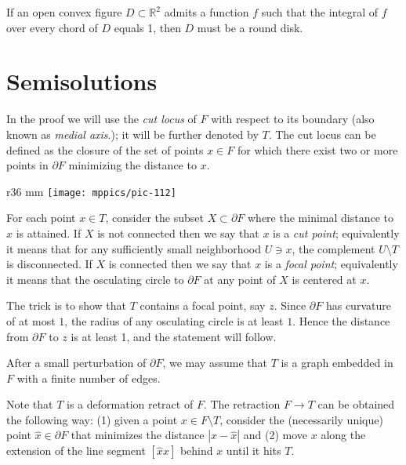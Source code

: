 \begin{pr}
If an open convex figure $D \subset \mathbb{R}^2$ admits a function $f$ such that the integral of $f$ over every chord of $D$ equals 1, then $D$ must be a round disk.
\end{pr}


\section*{Semisolutions}


In the proof we will use the \emph{cut locus}
of $F$ with respect to its boundary (also known as \emph{medial axis}.);
it will be further denoted by $T$.
The cut locus can be defined as the closure
of the set of points $x\in F$ 
for which there exist two or more points in $\partial F$ minimizing the distance to $x$.

\begin{wrapfigure}{r}{36 mm}
\vskip-2mm
\centering
\texttt{[image: mppics/pic-112]}
\end{wrapfigure}

For each point $x\in T$, consider the subset $X\subset\partial F$ where the minimal distance to $x$ is attained.
If $X$ is not connected then we say that $x$ is a \emph{cut point};
equivalently it means that for any sufficiently small neighborhood $U\ni x$, 
the complement $U\setminus T$ is disconnected.
If $X$ is connected 
then we say that $x$ is a \emph{focal point};
equivalently it means that the osculating circle to $\partial F$ at any point of $X$ is centered at $x$.

The trick is to show that $T$ contains a focal point, say $z$.
Since $\partial F$ has curvature of at most $1$, the radius of any osculating circle is at least $1$.
Hence the distance from $\partial F$ to $z$ is at least 1,
and the statement will follow.

\medskip

After a small perturbation of $\partial F$, we may assume that $T$ is a graph embedded in $F$ with a finite number of edges.

Note that $T$ is a
deformation retract of $F$.
The retraction $F\to T$ can be obtained the following way:
(1) given a point $x\in F\setminus T$,
consider the (necessarily unique) point $\hat x\in \partial F$ that minimizes the distance $|x-\hat x|$ and
(2) move $x$ along the extension of the line segment $[\hat x x]$ behind $x$ until it hits $T$.

